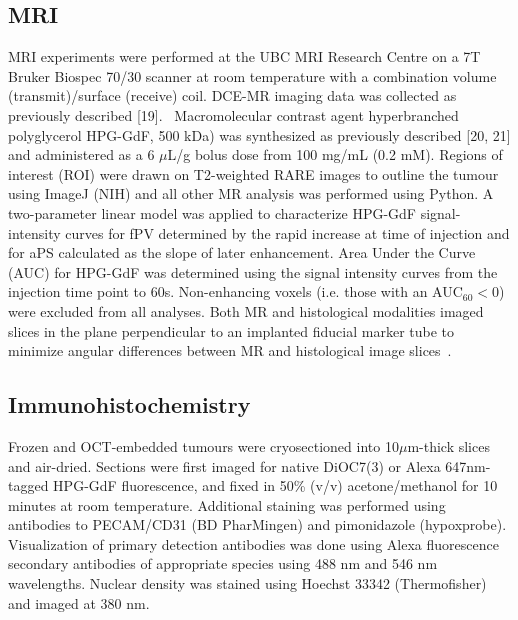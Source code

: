 \subsection{MRI}
MRI experiments were performed at the UBC MRI Research Centre on a 7T Bruker Biospec 70/30 scanner at room temperature with a combination volume (transmit)/surface (receive) coil.
DCE-MR imaging data was collected as previously described [19].~
Macromolecular contrast agent hyperbranched polyglycerol \acs{HPG-GdF}, 500 kDa) was synthesized as previously described [20, 21] and administered as a 6 $\mu$L/g bolus dose from 100 mg/mL (0.2 mM).
Regions of interest (ROI) were drawn on T2-weighted RARE images to outline the tumour using ImageJ (NIH) and all other MR analysis was performed using Python.
A two-parameter linear model was applied to characterize \acs{HPG-GdF} signal-intensity curves for \acs{fPV} determined by the rapid increase at time of injection and for \acs{aPS} calculated as the slope of later enhancement.
Area Under the Curve (\acs{AUC}) for \acs{HPG-GdF} was determined using the signal intensity curves from the injection time point to 60s.
Non-enhancing voxels (i.e. those with an AUC$_{60} < 0$) were excluded from all analyses.
Both MR and histological modalities imaged slices in the plane perpendicular to an implanted fiducial marker tube to minimize angular differences between MR and histological image slices~\cite{Bains:2009hh}.

\subsection{Immunohistochemistry}
Frozen and OCT-embedded tumours were cryosectioned into 10$\mu$m-thick slices and air-dried.
Sections were first imaged for native DiOC7(3) or Alexa 647nm-tagged \acs{HPG-GdF} fluorescence, and fixed in 50\% (v/v) acetone/methanol for 10 minutes at room temperature.
Additional staining was performed using antibodies to PECAM/CD31 (BD PharMingen) and pimonidazole (hypoxprobe).
Visualization of primary detection antibodies was done using Alexa fluorescence secondary antibodies of appropriate species using 488 nm and 546 nm wavelengths.
Nuclear density was stained using Hoechst 33342 (Thermofisher) and imaged at 380 nm.

